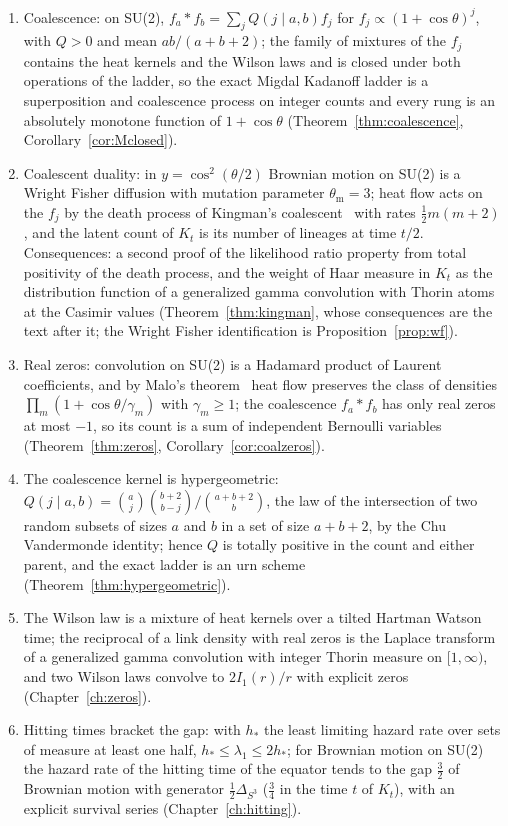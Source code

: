 \begin{enumerate}
\item Coalescence: on SU(2), $f_a*f_b=\sum_jQ(j\mid a,b)f_j$ for $f_j\propto(1+\cos\theta)^j$, with $Q>0$ and mean $ab/(a+b+2)$; the family of mixtures of the $f_j$ contains the heat kernels and the Wilson laws and is closed under both operations of the ladder, so the exact Migdal Kadanoff ladder is a superposition and coalescence process on integer counts and every rung is an absolutely monotone function of $1+\cos\theta$ (Theorem~\ref{thm:coalescence}, Corollary~\ref{cor:Mclosed}).
\item Coalescent duality: in $y=\cos^2(\theta/2)$ Brownian motion on SU(2) is a Wright Fisher diffusion with mutation parameter $\theta_{\mathrm m}=3$; heat flow acts on the $f_j$ by the death process of Kingman's coalescent~\cite{Ki82} with rates $\frac12m(m+2)$, and the latent count of $K_t$ is its number of lineages at time $t/2$. Consequences: a second proof of the likelihood ratio property from total positivity of the death process, and the weight of Haar measure in $K_t$ as the distribution function of a generalized gamma convolution with Thorin atoms at the Casimir values (Theorem~\ref{thm:kingman}, whose consequences are the text after it; the Wright Fisher identification is Proposition~\ref{prop:wf}).
\item Real zeros: convolution on SU(2) is a Hadamard product of Laurent coefficients, and by Malo's theorem~\cite{Malo} heat flow preserves the class of densities $\prod_m(1+\cos\theta/\gamma_m)$ with $\gamma_m\ge1$; the coalescence $f_a*f_b$ has only real zeros at most $-1$, so its count is a sum of independent Bernoulli variables (Theorem~\ref{thm:zeros}, Corollary~\ref{cor:coalzeros}).
\item The coalescence kernel is hypergeometric: $Q(j\mid a,b)=\binom aj\binom{b+2}{b-j}/\binom{a+b+2}{b}$, the law of the intersection of two random subsets of sizes $a$ and $b$ in a set of size $a+b+2$, by the Chu Vandermonde identity; hence $Q$ is totally positive in the count and either parent, and the exact ladder is an urn scheme (Theorem~\ref{thm:hypergeometric}).
\item The Wilson law is a mixture of heat kernels over a tilted Hartman Watson time; the reciprocal of a link density with real zeros is the Laplace transform of a generalized gamma convolution with integer Thorin measure on $[1,\infty)$, and two Wilson laws convolve to $2I_1(r)/r$ with explicit zeros (Chapter~\ref{ch:zeros}).
\item Hitting times bracket the gap: with $h_*$ the least limiting hazard rate over sets of measure at least one half, $h_*\le\lambda_1\le2h_*$; for Brownian motion on SU(2) the hazard rate of the hitting time of the equator tends to the gap $\frac32$ of Brownian motion with generator $\frac12\Delta_{S^3}$ ($\frac34$ in the time $t$ of $K_t$), with an explicit survival series (Chapter~\ref{ch:hitting}).

\end{enumerate}
